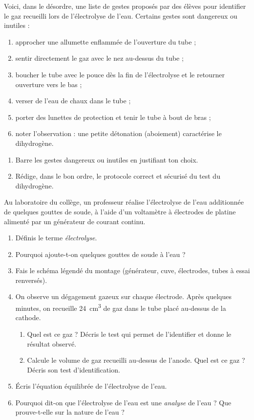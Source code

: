 \documentclass[11pt]{article}
\newcounter{popsec}
\newcounter{popsub}
\newcommand{\courssub}[1]{%
  \stepcounter{popsub}%
  \par\vspace{9pt}\noindent{\popxbold\fontsize{11.5}{13}\selectfont\color{popink}{\color{poporange}\thepopsec.\thepopsub}\hspace{6pt}#1}\par\nopagebreak\vspace{4pt}
}
\begin{document}
\begin{exercice}
Voici, dans le désordre, une liste de gestes proposés par des élèves pour identifier le gaz recueilli lors de l'électrolyse de l'eau. Certains gestes sont dangereux ou inutiles :
\begin{enumerate}
\item[a)] approcher une allumette enflammée de l'ouverture du tube ;
\item[b)] sentir directement le gaz avec le nez au-dessus du tube ;
\item[c)] boucher le tube avec le pouce dès la fin de l'électrolyse et le retourner ouverture vers le bas ;
\item[d)] verser de l'eau de chaux dans le tube ;
\item[e)] porter des lunettes de protection et tenir le tube à bout de bras ;
\item[f)] noter l'observation : une petite détonation (aboiement) caractérise le dihydrogène.
\end{enumerate}
\begin{enumerate}
\item Barre les gestes dangereux ou inutiles en justifiant ton choix.
\item Rédige, dans le bon ordre, le protocole correct et sécurisé du test du dihydrogène.
\end{enumerate}
\end{exercice}

\courssub{Je me prépare au BEPC}

\begin{exercice}
Au laboratoire du collège, un professeur réalise l'électrolyse de l'eau additionnée de quelques gouttes de soude, à l'aide d'un voltamètre à électrodes de platine alimenté par un générateur de courant continu.
\begin{enumerate}
\item Définis le terme \emph{électrolyse}.
\item Pourquoi ajoute-t-on quelques gouttes de soude à l'eau ?
\item Fais le schéma légendé du montage (générateur, cuve, électrodes, tubes à essai renversés).
\item On observe un dégagement gazeux sur chaque électrode. Après quelques minutes, on recueille \SI{24}{cm^3} de gaz dans le tube placé au-dessus de la cathode.
\begin{enumerate}
\item Quel est ce gaz ? Décris le test qui permet de l'identifier et donne le résultat observé.
\item Calcule le volume de gaz recueilli au-dessus de l'anode. Quel est ce gaz ? Décris son test d'identification.
\end{enumerate}
\item Écris l'équation équilibrée de l'électrolyse de l'eau.
\item Pourquoi dit-on que l'électrolyse de l'eau est une \emph{analyse} de l'eau ? Que prouve-t-elle sur la nature de l'eau ?
\end{enumerate}
\end{exercice}
\end{document}
